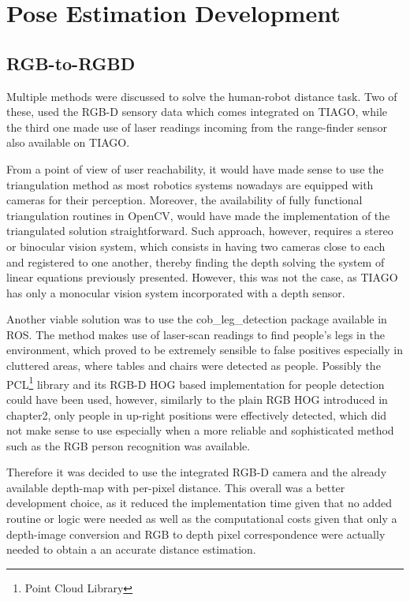 \chapter{Pose Estimation Development}
\label{chapter4}

\section{RGB-to-RGBD}

Multiple methods were discussed to solve the human-robot distance task. Two of these, used the RGB-D sensory data which comes integrated on TIAGO, while the third one made use of laser readings incoming from the range-finder sensor also available on TIAGO.

From a point of view of user reachability, it would have made sense to use the triangulation method as most robotics systems nowadays are equipped with cameras for their perception. Moreover, the availability of fully functional triangulation routines in OpenCV, would have made the implementation of the triangulated solution straightforward. Such approach, however, requires a stereo or binocular vision system, which consists in having two cameras close to each and registered to one another, thereby finding the depth solving the system of linear equations previously presented. However, this was not the case, as TIAGO has only a monocular vision system incorporated with a depth sensor.

Another viable solution was to use the cob\_leg\_detection \cite{website:cobLegDetection} package available in ROS. The method makes use of laser-scan readings to find people's legs in the environment, which proved to be extremely sensible to false positives especially in cluttered areas, where tables and chairs were detected as people. Possibly the PCL\footnote{Point Cloud Library} library and its RGB-D HOG based implementation for people detection \cite{munaro2014fast} could have been used, however, similarly to the plain RGB HOG introduced in chapter2, only people in up-right positions were effectively detected, which did not make sense to use especially when a more reliable and sophisticated method such as the RGB person recognition was available.

Therefore it was decided to use the integrated RGB-D camera and the already available depth-map with per-pixel distance. This overall was a better development choice, as it reduced the implementation time given that no added routine or logic were needed as well as the computational costs given that only a depth-image conversion and RGB to depth pixel correspondence were actually needed to obtain a an accurate distance estimation.

